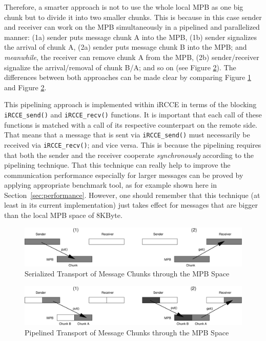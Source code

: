 \documentclass[fontsize=10pt, paper=a4, DIV12, pagesize=auto]{scrartcl}
\begin{document}
Therefore, a smarter approach is not to use the whole local MPB as one big chunk but to divide it into two smaller chunks. This is because in this case sender and receiver can work on the MPB simultaneously in a pipelined and parallelized manner: (1a) sender puts message chunk A into the MPB, (1b) sender signalizes the arrival of chunk A, (2a) sender puts message chunk B into the MPB; and \emph{meanwhile}, the receiver can remove chunk A from the MPB, (2b) sender/receiver signalize the arrival/removal of chunk B/A; and so on (see Figure \ref{fig:iRCCE_Pipeline2}).
The differences between both approaches can be made clear by comparing Figure \ref{fig:iRCCE_Pipeline1} and Figure \ref{fig:iRCCE_Pipeline2}.

This pipelining approach is implemented within iRCCE in terms of the blocking \texttt{iRCCE\_send()} and \texttt{iRCCE\_recv()} functions.
It is important that each call of these functions is matched with a call of its respective counterpart on the remote side. That means that a message that is sent via \texttt{iRCCE\_send()} must necessarily be received via \texttt{iRCCE\_recv()}; and vice versa. This is because the pipelining requires that both the sender and the receiver cooperate \emph{synchronously} according to the pipelining technique.
That this technique can really help to improve the communication performance especially for larger messages can be proved by applying appropriate benchmark tool, as for example shown here in \mbox{Section \ref{sec:performance}}.
However, one should remember that this technique (at least in its current implementation) just takes effect for messages that are bigger than the local MPB space of 8KByte.

\begin{figure}[ht]
	\centering
		\includegraphics[width=13.0cm]{iRCCE_Pipeline1.eps}
	\caption{Serialized Transport of Message Chunks through the MPB Space}
	\label{fig:iRCCE_Pipeline1}
\end{figure}


\begin{figure}[ht]
  \vspace{0.5cm}
	\centering
		\includegraphics[width=13.0cm]{iRCCE_Pipeline2.eps}
	\caption{Pipelined Transport of Message Chunks through the MPB Space}
	\label{fig:iRCCE_Pipeline2}
	\vspace{0.5cm}
\end{figure}
\end{document}
